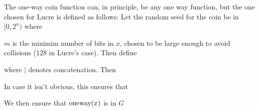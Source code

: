 \documentclass[a4paper,titlepage]{article}
\begin{document}
The one-way coin function can, in principle, be any one way function,
but the one chosen for Lucre is defined as follows: Let the random
seed for the coin be in $[0,2^n)$ where 


$m$ is the minimim number of bits in $x$, chosen to be large
enough to avoid collisions (128 in Lucre's case). Then define


where $|$ denotes concatenation. Then


In case it isn't obvious, this ensures that


We then ensure that $\textrm{oneway}(x)$ is in $G$

\end{document}
